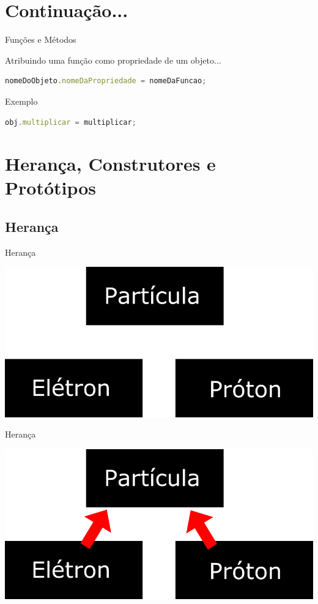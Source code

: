 \documentclass[xcolor=dvipsnames,table]{beamer}
\begin{document}
\section{Continuação...}
\begin{frame}[fragile]{Funções e Métodos}
	\begin{block}{Atribuindo uma função como propriedade de um objeto...}
		\begin{lstlisting}[language=JavaScript]
nomeDoObjeto.nomeDaPropriedade = nomeDaFuncao;
\end{lstlisting}	
	\end{block} \pause
	\begin{block}{Exemplo}
		\begin{lstlisting}[language=JavaScript]
obj.multiplicar = multiplicar;
\end{lstlisting}	
	\end{block}
\end{frame}

\section{Herança, Construtores e Protótipos}
\subsection{Herança}
\begin{frame}{Herança}
	\begin{center}
		\includegraphics[scale=0.3]{images/heranca01.png}
	\end{center}
\end{frame}

\begin{frame}{Herança}
	\begin{center}
		\includegraphics[scale=0.3]{images/heranca02.png}
	\end{center}
\end{frame}
\end{document}
